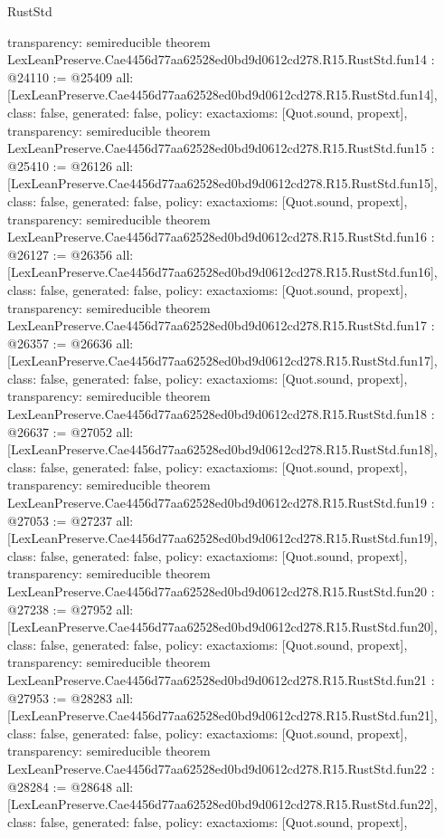 \begin{lexlean}{RustStd}
\begin{coremodule}
{  transparency: semireducible
}
theorem LexLeanPreserve.Cae4456d77aa62528ed0bd9d0612cd278.R15.RustStd.fun14 : @24110 := @25409 {
  all: [LexLeanPreserve.Cae4456d77aa62528ed0bd9d0612cd278.R15.RustStd.fun14],
  class: false,
  generated: false,
  policy: exact{axioms: [Quot.sound, propext]},
  transparency: semireducible
}
theorem LexLeanPreserve.Cae4456d77aa62528ed0bd9d0612cd278.R15.RustStd.fun15 : @25410 := @26126 {
  all: [LexLeanPreserve.Cae4456d77aa62528ed0bd9d0612cd278.R15.RustStd.fun15],
  class: false,
  generated: false,
  policy: exact{axioms: [Quot.sound, propext]},
  transparency: semireducible
}
theorem LexLeanPreserve.Cae4456d77aa62528ed0bd9d0612cd278.R15.RustStd.fun16 : @26127 := @26356 {
  all: [LexLeanPreserve.Cae4456d77aa62528ed0bd9d0612cd278.R15.RustStd.fun16],
  class: false,
  generated: false,
  policy: exact{axioms: [Quot.sound, propext]},
  transparency: semireducible
}
theorem LexLeanPreserve.Cae4456d77aa62528ed0bd9d0612cd278.R15.RustStd.fun17 : @26357 := @26636 {
  all: [LexLeanPreserve.Cae4456d77aa62528ed0bd9d0612cd278.R15.RustStd.fun17],
  class: false,
  generated: false,
  policy: exact{axioms: [Quot.sound, propext]},
  transparency: semireducible
}
theorem LexLeanPreserve.Cae4456d77aa62528ed0bd9d0612cd278.R15.RustStd.fun18 : @26637 := @27052 {
  all: [LexLeanPreserve.Cae4456d77aa62528ed0bd9d0612cd278.R15.RustStd.fun18],
  class: false,
  generated: false,
  policy: exact{axioms: [Quot.sound, propext]},
  transparency: semireducible
}
theorem LexLeanPreserve.Cae4456d77aa62528ed0bd9d0612cd278.R15.RustStd.fun19 : @27053 := @27237 {
  all: [LexLeanPreserve.Cae4456d77aa62528ed0bd9d0612cd278.R15.RustStd.fun19],
  class: false,
  generated: false,
  policy: exact{axioms: [Quot.sound, propext]},
  transparency: semireducible
}
theorem LexLeanPreserve.Cae4456d77aa62528ed0bd9d0612cd278.R15.RustStd.fun20 : @27238 := @27952 {
  all: [LexLeanPreserve.Cae4456d77aa62528ed0bd9d0612cd278.R15.RustStd.fun20],
  class: false,
  generated: false,
  policy: exact{axioms: [Quot.sound, propext]},
  transparency: semireducible
}
theorem LexLeanPreserve.Cae4456d77aa62528ed0bd9d0612cd278.R15.RustStd.fun21 : @27953 := @28283 {
  all: [LexLeanPreserve.Cae4456d77aa62528ed0bd9d0612cd278.R15.RustStd.fun21],
  class: false,
  generated: false,
  policy: exact{axioms: [Quot.sound, propext]},
  transparency: semireducible
}
theorem LexLeanPreserve.Cae4456d77aa62528ed0bd9d0612cd278.R15.RustStd.fun22 : @28284 := @28648 {
  all: [LexLeanPreserve.Cae4456d77aa62528ed0bd9d0612cd278.R15.RustStd.fun22],
  class: false,
  generated: false,
  policy: exact{axioms: [Quot.sound, propext]},
}
\end{coremodule}
\end{lexlean}
